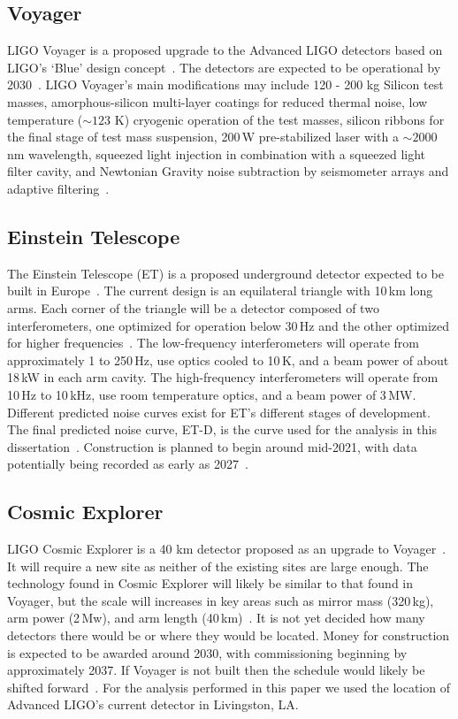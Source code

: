 \subsection{Voyager}

LIGO Voyager is a proposed upgrade to the Advanced LIGO detectors based on LIGO's `Blue' design concept~\cite{voyagerupgrade}. The detectors are expected to be operational by 2030~\cite{whitepaper2018}. LIGO Voyager's main modifications may include 120 - 200 kg Silicon test masses, amorphous-silicon multi-layer coatings for reduced thermal noise, low temperature ($\sim123$ K) cryogenic operation of the test masses, silicon ribbons for the final stage of test mass suspension, 200\,W pre-stabilized laser with a $\sim2000$ nm wavelength, squeezed light injection in combination with a squeezed light filter cavity, and Newtonian Gravity noise subtraction by seismometer arrays and adaptive filtering~\cite{2015PhRvD..91h2001D, whitepaper2018}.

\subsection{Einstein Telescope}

The Einstein Telescope (ET) is a proposed underground detector expected to be built in Europe~\cite{0264-9381-27-19-194002}. The current design is an equilateral triangle with 10\,km long arms. Each corner of the triangle will be a detector composed of two interferometers, one optimized for operation below 30\,Hz and the other optimized for higher frequencies~\cite{ET:design}. The low-frequency interferometers will operate from approximately 1 to 250\,Hz, use optics cooled to 10\,K, and a beam power of about 18\,kW in each arm cavity. The high-frequency interferometers will operate from 10\,Hz to 10\,kHz, use room temperature optics, and a beam power of 3\,MW. Different predicted noise curves exist for ET's different stages of development. The final predicted noise curve, ET-D, is the curve used for the analysis in this dissertation~\cite{ET:design}. Construction is planned to begin around mid-2021, with data potentially being recorded as early as 2027~\cite{ET:design, whitepaper2018}.

\subsection{Cosmic Explorer}

LIGO Cosmic Explorer is a 40 km detector proposed as an upgrade to Voyager~\cite{2017CQGra..34d4001A}. It will require a new site as neither of the existing sites are large enough. The technology found in Cosmic Explorer will likely be similar to that found in Voyager, but the scale will increases in key areas such as mirror mass (320\,kg), arm power (2\,Mw), and arm length (40\,km)~\cite{whitepaper2018}. It is not yet decided how many detectors there would be or where they would be located. Money for construction is expected to be awarded around 2030, with commissioning beginning by approximately 2037. If Voyager is not built then the schedule would likely be shifted forward~\cite{whitepaper2018}. For the analysis performed in this paper we used the location of Advanced LIGO's current detector in Livingston, LA.


